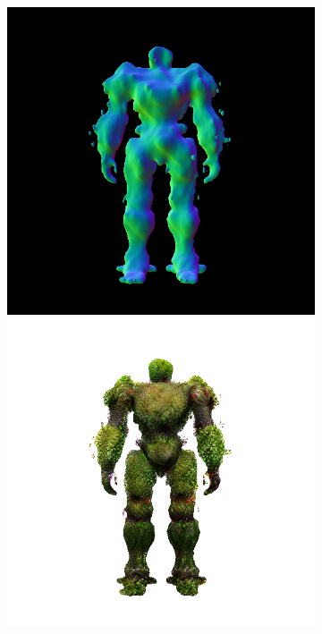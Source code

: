\begin{figure}[ht]
\begin{subfigure}[b]{0.222\textwidth}
        \includegraphics[width=\textwidth]{figures/appendix/magic123_refine_robot_back_10000_part2.png}
        \includegraphics[width=\textwidth]{figures/appendix/magic123_refine_robot_back_10000_part1.png}

\end{subfigure}
\end{figure}
